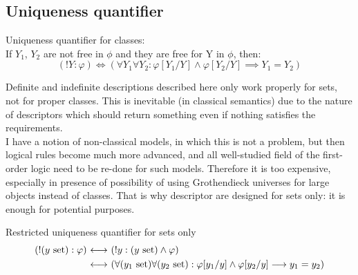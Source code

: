 \def\topic{}


\subsection{Uniqueness quantifier}
\begin{definition}
\label{def:uniqueness quantifier}
Uniqueness quantifier for classes:\\
If $Y_1$, $Y_2$ are not free in $\phi$ and they are free for Y in $\phi$, then:
\[
(!Y:\varphi)\iff (\forall Y_1\forall Y_2:\varphi[Y_1/Y]\land\varphi[Y_2/Y]\implies Y_1=Y_2)
\]
\end{definition}
\begin{note}

Definite and indefinite descriptions described here only work properly for sets, not for proper classes. This is inevitable (in classical semantics) due to the nature of descriptors which should return something even if nothing  satisfies the requirements.\\
I have a notion of non-classical models, in which this is not a problem, but then logical rules become much more advanced, and all well-studied field of the first-order logic need to be re-done for such models. Therefore it is too expensive, especially in presence of possibility of using Grothendieck universes for large objects instead of classes. That is why descriptor are designed for sets only: it is enough for potential purposes.\\
\end{note}
\begin{definition}
\label{def:restricted uniqueness quantifier}
Restricted uniqueness quantifier for sets only
\begin{align*}
(!(y\mathrm{\ set}):\varphi)
&{\ \longleftrightarrow\ } 
(!y:(y\mathrm{\ set})\land\varphi)
\\
&{\ \longleftrightarrow\ } 
(\forall (y_1\mathrm{\ set})\forall (y_2\mathrm{\ set}):\varphi[y_1/y]\land\varphi[y_2/y]\longrightarrow y_1=y_2)
\end{align*}

\end{definition}

